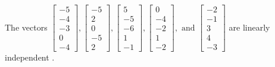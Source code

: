 \begin{exercise}
\begin{exerciseStatement}
  \end{exerciseStatement}
  \begin{exerciseAnswer}
   The vectors \(\left[\begin{array}{r}
-5 \\
-4 \\
-3 \\
0 \\
-4
\end{array}\right] , \left[\begin{array}{r}
-5 \\
2 \\
0 \\
-5 \\
2
\end{array}\right] , \left[\begin{array}{r}
5 \\
-5 \\
-6 \\
1 \\
-1
\end{array}\right] , \left[\begin{array}{r}
0 \\
-4 \\
-2 \\
1 \\
-2
\end{array}\right] , \text{ and } \left[\begin{array}{r}
-2 \\
-1 \\
3 \\
4 \\
-3
\end{array}\right]\) are 
  	 linearly independent  .
  


  \end{exerciseAnswer}
\end{exercise}